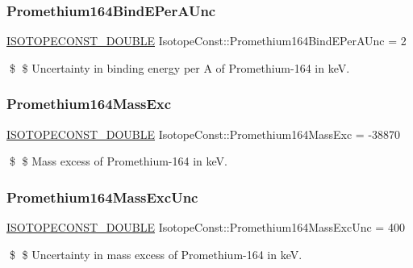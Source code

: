 \subsubsection{\texorpdfstring{Promethium164\+Bind\+E\+Per\+A\+Unc}{Promethium164BindEPerAUnc}}
{\footnotesize\ttfamily \mbox{\hyperlink{group___isotope_const-_macros_ga8f45a7272ce02c0b4c65c44636ed719a}{I\+S\+O\+T\+O\+P\+E\+C\+O\+N\+S\+T\+\_\+\+D\+O\+U\+B\+LE}} Isotope\+Const\+::\+Promethium164\+Bind\+E\+Per\+A\+Unc = 2}

\$ \$ Uncertainty in binding energy per A of Promethium-\/164 in keV. \mbox{\label{group___isotope_const-_promethium-_pm164_ga3ad22895327cb400a576b1492fc6c87c}} 
\subsubsection{\texorpdfstring{Promethium164\+Mass\+Exc}{Promethium164MassExc}}
{\footnotesize\ttfamily \mbox{\hyperlink{group___isotope_const-_macros_ga8f45a7272ce02c0b4c65c44636ed719a}{I\+S\+O\+T\+O\+P\+E\+C\+O\+N\+S\+T\+\_\+\+D\+O\+U\+B\+LE}} Isotope\+Const\+::\+Promethium164\+Mass\+Exc = -\/38870}

\$ \$ Mass excess of Promethium-\/164 in keV. \mbox{\label{group___isotope_const-_promethium-_pm164_gafc814a39d4dd646e79fb86e1a38d91ef}} 
\subsubsection{\texorpdfstring{Promethium164\+Mass\+Exc\+Unc}{Promethium164MassExcUnc}}
{\footnotesize\ttfamily \mbox{\hyperlink{group___isotope_const-_macros_ga8f45a7272ce02c0b4c65c44636ed719a}{I\+S\+O\+T\+O\+P\+E\+C\+O\+N\+S\+T\+\_\+\+D\+O\+U\+B\+LE}} Isotope\+Const\+::\+Promethium164\+Mass\+Exc\+Unc = 400}

\$ \$ Uncertainty in mass excess of Promethium-\/164 in keV. \mbox{\label{group___isotope_const-_promethium-_pm164_gaf9b605806138ab0fc3258b92ed2b5118}} 
